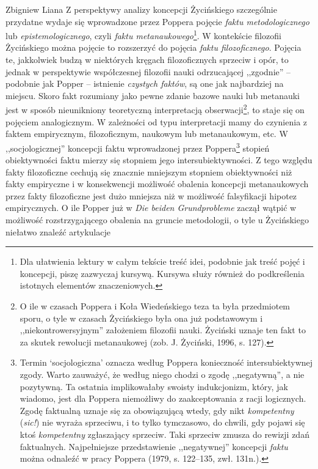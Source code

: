 \begin{artplenv}{Zbigniew Liana}
Z perspektywy analizy koncepcji Życińskiego szczególnie przydatne wydaje się wprowadzone przez Poppera pojęcie
\textit{faktu metodologicznego} lub \textit{epistemologicznego}, czyli \textit{faktu metanaukowego}\footnote{Dla ułatwienia
lektury w całym tekście treść idei, podobnie jak treść pojęć i koncepcji, piszę zazwyczaj kursywą. Kursywa służy
również do podkreślenia istotnych elementów znaczeniowych.}. W kontekście filozofii Życińskiego można pojęcie to
rozszerzyć do pojęcia \textit{faktu filozoficznego}. Pojęcia te, jakkolwiek budzą w niektórych kręgach filozoficznych
sprzeciw i opór, to jednak w perspektywie współczesnej filozofii nauki odrzucającej ,,zgodnie'' -- podobnie jak Popper --
istnienie \textit{czystych faktów}, są one jak najbardziej na miejscu. Skoro fakt rozumiany jako pewne zdanie bazowe
nauki lub metanauki jest w sposób nieunikniony teoretyczną interpretacją obserwacji\footnote{O ile w czasach Poppera i Koła
Wiedeńskiego teza ta była przedmiotem sporu, o tyle w czasach Życińskiego była ona już podstawowym i ,,niekontrowersyjnym''
założeniem filozofii nauki. Życiński uznaje ten fakt to za skutek rewolucji metanaukowej
\label{ref:RNDNNdGM9DYkK}(zob. J. Życiński, 1996, s. 127).}, to staje się on pojęciem analogicznym. W zależności od
typu interpretacji mamy do czynienia z faktem empirycznym, filozoficznym, naukowym lub metanaukowym,
etc. W ,,socjologicznej'' koncepcji faktu wprowadzonej przez Poppera\footnote{Termin `socjologiczna' oznacza według Poppera
konieczność intersubiektywnej zgody. Warto zauważyć, że według niego chodzi o zgodę ,,negatywną'', a nie pozytywną. Ta
ostatnia implikowałaby swoisty indukcjonizm, który, jak wiadomo, jest dla Poppera niemożliwy do zaakceptowania z racji
logicznych. Zgodę faktualną uznaje się za obowiązującą wtedy, gdy nikt \textit{kompetentny} (\textit{sic!}) nie wyraża
sprzeciwu, i to tylko tymczasowo, do chwili, gdy pojawi się ktoś \textit{kompetentny} zgłaszający sprzeciw. Taki sprzeciw
zmusza do rewizji zdań faktualnych. Najpełniejsze przedstawienie ,,negatywnej'' koncepcji \textit{faktu} można odnaleźć w pracy
Poppera \label{ref:RNDFSE3yxffmO}(1979, s. 122–135, zwł. 131n.).} stopień obiektywności faktu mierzy się stopniem
jego intersubiektywności. Z tego względu fakty filozoficzne cechują się znacznie mniejszym stopniem obiektywności niż
fakty empiryczne i w konsekwencji możliwość obalenia koncepcji metanaukowych przez fakty filozoficzne jest dużo
mniejsza niż w możliwość falsyfikacji hipotez empirycznych. O ile Popper już w \textit{Die beiden Grundprobleme} zaczął
wątpić w możliwość rozstrzygającego obalenia na gruncie metodologii, o tyle u Życińskiego niełatwo znaleźć artykulacje

\end{artplenv}
